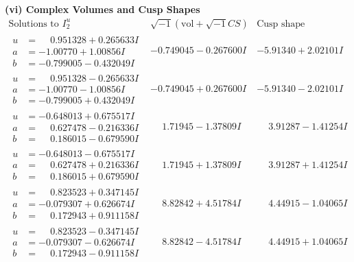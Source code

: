 \documentclass[1p]{elsarticle_modified}
\theoremstyle{definition}
\newcommand{\I}{\sqrt{-1}}
\begin{document}
\newpage\flushleft \textbf{(vi) Complex Volumes and Cusp Shapes}
$$\begin{array}{c|c|c}  
\text{Solutions to }I^u_{2}& \I (\text{vol} + \sqrt{-1}CS) & \text{Cusp shape}\\
 \hline 
\begin{aligned}
u &= \phantom{-}0.951328 + 0.265633 I \\
a &= -1.00770 + 1.00856 I \\
b &= -0.799005 - 0.432049 I\end{aligned}
 & -0.749045 - 0.267600 I & -5.91340 + 2.02101 I \\ \hline\begin{aligned}
u &= \phantom{-}0.951328 - 0.265633 I \\
a &= -1.00770 - 1.00856 I \\
b &= -0.799005 + 0.432049 I\end{aligned}
 & -0.749045 + 0.267600 I & -5.91340 - 2.02101 I \\ \hline\begin{aligned}
u &= -0.648013 + 0.675517 I \\
a &= \phantom{-}0.627478 - 0.216336 I \\
b &= \phantom{-}0.186015 - 0.679590 I\end{aligned}
 & \phantom{-}1.71945 - 1.37809 I & \phantom{-}3.91287 - 1.41254 I \\ \hline\begin{aligned}
u &= -0.648013 - 0.675517 I \\
a &= \phantom{-}0.627478 + 0.216336 I \\
b &= \phantom{-}0.186015 + 0.679590 I\end{aligned}
 & \phantom{-}1.71945 + 1.37809 I & \phantom{-}3.91287 + 1.41254 I \\ \hline\begin{aligned}
u &= \phantom{-}0.823523 + 0.347145 I \\
a &= -0.079307 + 0.626674 I \\
b &= \phantom{-}0.172943 + 0.911158 I\end{aligned}
 & \phantom{-}8.82842 + 4.51784 I & \phantom{-}4.44915 - 1.04065 I \\ \hline\begin{aligned}
u &= \phantom{-}0.823523 - 0.347145 I \\
a &= -0.079307 - 0.626674 I \\
b &= \phantom{-}0.172943 - 0.911158 I\end{aligned}
 & \phantom{-}8.82842 - 4.51784 I & \phantom{-}4.44915 + 1.04065 I \\ \hline\begin{aligned}

\end{aligned}
\end{array}$$
\end{document}
